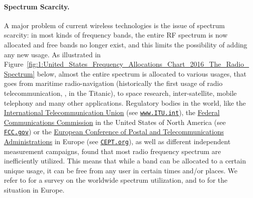 \paragraph{Spectrum Scarcity.}
%
A major problem of current wireless technologies is the issue of spectrum scarcity:
in most kinds of frequency bands, the entire RF spectrum is now allocated and free bands no longer exist, and this limits the possibility of adding any new usage.
As illustrated in Figure~\ref{fig:1:United_States_Frequency_Allocations_Chart_2016_The_Radio_Spectrum} below,
almost the entire spectrum
is allocated to various usages, that goes from maritime radio-navigation (historically the first usage of radio telecommunication, \eg, in the Titanic), to space research, inter-satellite, mobile telephony and many other applications.
%
Regulatory bodies in the world, like the
\href{https://www.itu.int/en/Pages/default.aspx}{International Telecommunication Union} (see \href{https://www.itu.int/}{\texttt{www.ITU.int}}),
the \href{https://www.fcc.gov/}{Federal Communications Commission} in the United States of North America (see \href{https://www.fcc.gov/}{\texttt{FCC.gov}})
or the \href{https://cept.org}{European Conference of Postal and Telecommunications Administrations} in Europe (see \href{https://www.CEPT.org/}{\texttt{CEPT.org}}),
as well as different independent measurement campaigns, found that most radio frequency spectrum are inefficiently utilized.
This means that while a band can be allocated to a certain unique usage, it can be free from any user in certain times and/or places.
We refer to \cite{patil2011survey} for a survey on the worldwide spectrum utilization, and to \cite{valenta2010survey} for the situation in Europe.



